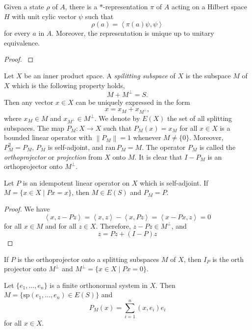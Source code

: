 \begin{theorem}
    Given a state \(\rho\) of \(A\), there is a \(\ast\)-representation \(\pi\) of \(A\) acting on a Hilbert space \(H\) with unit cylic vector \(\psi\) such that
    \[\rho(a)=\left \langle \pi(a) \psi,\psi  \right \rangle\]
    for every \(a\) in \(A\). Moreover, the representation is unique up to unitary equivalence.
\end{theorem}
\begin{proof}
    \cite[Theorem 4.5.2]{MR1468229}
\end{proof}

Let \(X\) be an inner product space. A \emph{spilitting subspace} of \(X\) is the subspace \(M\) of \(X\) which is the following property holds,
\[M+M^\perp=S.\]
Then any vector \(x \in X\) can be uniquely expressed in the form
\[x=x_M+x_{M^{\perp}},\]
where \(x_M \in M\) and \(x_{M^\perp} \in M^\perp\). We denote by \(E(X)\) the set of all splitting subspaces.
The map \(P_M:X\to X\) such that \(P_M(x)=x_M\) for all \(x \in X\) is a bounded linear operator with \(\left \lVert P_M \right \rVert=1\) whenever \(M \neq \{0\}\). Moreover, \(P^2_M=P_M\), \(P_M\) is self-adjoint, and \(\mathrm{ran}\, P_M = M\). The operator \(P_M\) is called the \emph{orthoprojector} or \emph{projection} from \(X\) onto \(M\). It is clear that \(I-P_M\) is an orthoprojector onto \(M^\perp\).
\begin{proposition}
    Let \(P\) is an idempotent linear operator on \(X\) which is self-adjoint. If \(M=\{x\in X \mid Px=x\}\), then \(M \in E(S)\) and \(P_M = P\).
    \begin{proof}
        We have
        \[\left \langle x,z-Pz \right \rangle=\left \langle x,z \right \rangle-\left \langle x,Pz \right \rangle=\left \langle x-Px,z \right \rangle=0\]
        for all \(x \in M\) and for all \(z \in X\). Therefore, \(z-Pz \in M^\perp\), and \[z=Pz+(I-P)z\]
    \end{proof}
\end{proposition}
\begin{corollary}
    If \(P\) is the orthoprojector onto a splitting subspaces \(M\) of \(X\), then \(I_P\) is the orth projector onto \(M^\perp\) and \(M^\perp=\{x\in X \mid Px=0\}\).
\end{corollary}
\begin{proposition}
    Let \(\{e_1,\dots,e_n\}\) is a finite orthonormal system in \(X\). Then \(M=\{\mathrm{sp}(e_1,\dots,e_n) \in E(S)\}\) and
    \[P_M(x) = \sum_{i=1}^{n} (x,e_i)e_i\]
    for all \(x \in X\).
\end{proposition}
